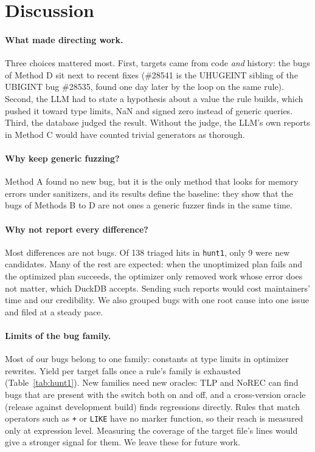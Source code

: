 \section{Discussion}
\label{sec:discussion}

\paragraph{What made directing work.} Three choices mattered most. First, targets came from code \emph{and} history:
the bugs of Method D sit next to recent fixes (\#28541 is the UHUGEINT sibling of the UBIGINT bug \#28535, found one day later by the loop on the same rule). Second, the LLM had to state a hypothesis about a value the rule builds, which
pushed it toward type limits, NaN and signed zero instead of generic queries. Third, the database judged the result.
Without the judge, the LLM's own reports in Method C would have counted trivial generators as thorough.

\paragraph{Why keep generic fuzzing?} Method A found no new bug, but it is the only method that looks for memory
errors under sanitizers, and its results define the baseline: they show that the bugs of Methods B to D are not ones a
generic fuzzer finds in the same time.

\paragraph{Why not report every difference?} Most differences are not bugs. Of 138 triaged hits in \texttt{hunt1},
only 9 were new candidates. Many of the rest are expected: when the unoptimized plan fails and the optimized plan
succeeds, the optimizer only removed work whose error does not matter, which DuckDB accepts. Sending such reports would
cost maintainers' time and our credibility. We also grouped bugs with one root cause into one issue and filed at a
steady pace.

\paragraph{Limits of the bug family.} Most of our bugs belong to one family: constants at type limits in optimizer
rewrites. Yield per target falls once a rule's family is exhausted (Table~\ref{tab:hunt1}). New families need new
oracles: TLP and NoREC can find bugs that are present with the switch both on and off, and a cross-version oracle
(release against development build) finds regressions directly. Rules that match operators such as \texttt{+} or
\texttt{LIKE} have no marker function, so their reach is measured only at expression level. Measuring the coverage of
the target file's lines would give a stronger signal for them. We leave these for future work.

